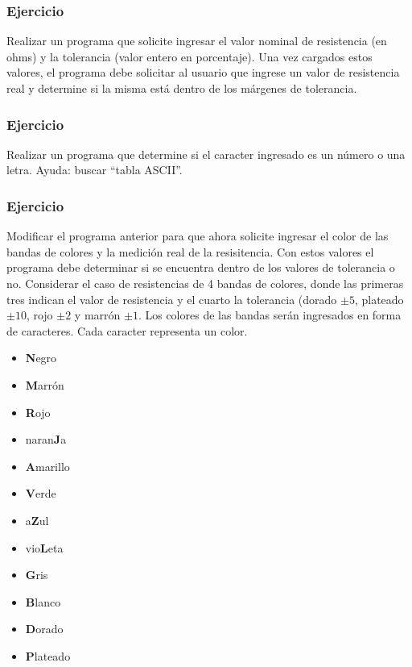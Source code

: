 \subsubsection{Ejercicio}
Realizar un programa que solicite ingresar el valor nominal de resistencia (en ohms) y la tolerancia (valor entero en porcentaje). Una vez cargados estos valores, el programa debe solicitar al usuario que ingrese un valor de resistencia real y determine si la misma está dentro de los márgenes de tolerancia. 
{\small
  \lstset{inputencoding=utf8/latin1}
  
}

\subsubsection{Ejercicio}
Realizar un programa que determine si el caracter ingresado es un número o una letra. Ayuda: buscar ``tabla ASCII''.
{\small
  \lstset{inputencoding=utf8/latin1}
  
}

\subsubsection{Ejercicio}
Modificar el programa anterior para que ahora solicite ingresar el color de las bandas de colores y la medición real de la resisitencia. Con estos valores el programa debe determinar si se encuentra dentro de los valores de tolerancia o no. Considerar el caso de resistencias de 4 bandas de colores, donde las primeras tres indican el valor de resistencia y el cuarto la tolerancia (dorado $ \pm 5 $, plateado $\pm 10$, rojo $\pm 2$ y marrón $\pm 1$. Los colores de las bandas serán ingresados en forma de caracteres. Cada caracter representa un color.
\begin{itemize}
  \item \textbf{N}egro
  \item \textbf{M}arrón
  \item \textbf{R}ojo
  \item naran\textbf{J}a
  \item \textbf{A}marillo
  \item \textbf{V}erde
  \item a\textbf{Z}ul
  \item vio\textbf{L}eta
  \item \textbf{G}ris
  \item \textbf{B}lanco
  \item \textbf{D}orado
  \item \textbf{P}lateado
  \end{itemize}
{\small
  \lstset{inputencoding=utf8/latin1}
  
}

